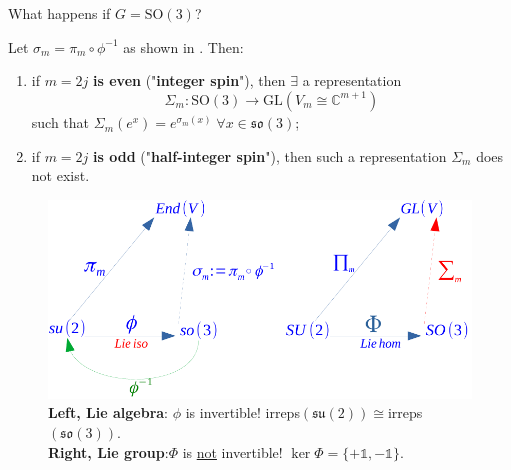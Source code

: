 \documentclass[../main.tex]{subfiles}
\begin{document}
What happens if $G=\textrm{SO}(3)$?
\begin{theorem}
Let $\sigma_m=\pi_m\circ\phi^{-1}$ as shown in . Then:
\begin{enumerate}
    \item if $m=2j$ \textbf{is even} ("\textbf{integer spin}"), then $\exists$ a representation \[\Sigma_m:\textrm{SO}(3)\xrightarrow[]{}\textrm{GL}(V_m\cong \mathbb{C}^{m+1})\] such that $\Sigma_m(e^x)=e^{\sigma_m(x)} \; \forall x\in\mathfrak{so}(3)$;
    \item if $m=2j$ \textbf{is odd} ("\textbf{half-integer spin}"), then such a representation $\Sigma_m$ does not exist.
\end{enumerate}
\end{theorem}
\begin{figure}[h!]
    \centering
    \includegraphics{images/groupalgebra.pdf}
    \caption[Lie algebra and Lie group]{\textbf{Left, Lie algebra}: $\phi$ is invertible!  irreps$(\mathfrak{su}(2))\cong$irreps$(\mathfrak{so}(3))$.\\
    \textbf{Right, Lie group}:$\Phi$ is \underline{not} invertible!  $\ker\Phi=\{+\mathbb{1},-\mathbb{1}\}$.}
\end{figure}
\end{document}
